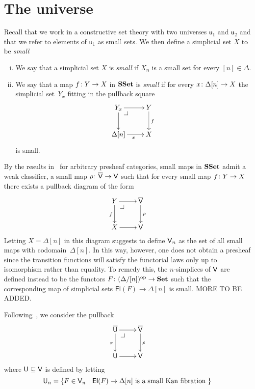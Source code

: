 \documentclass[reqno,10pt,a4paper,oneside,draft]{amsart}
\begin{document}
\newpage

\section{The universe}

Recall that we work in a constructive set theory with two universes $\mathsf{u}_1$ and $\mathsf{u}_2$
and that we refer to elements of $\mathsf{u}_1$ as small sets. We then define a simplicial
set $X$ to be \emph{small}


\begin{definition} \hfill 
\label{thm:small}
\begin{enumerate}[(i)]
\item We say that a simplicial set $X$ is \emph{small}  if $X_n$ is a small set for every $[n] \in \Delta$. 
\item We say that a map $f \colon Y \to X$ in $\mathbf{SSet}$ is \emph{small} if for every $x \colon \Delta[n] 
\to X$ the simplicial set~$Y_x$ fitting in the pullback square
\[
\xymatrix{
Y_x \ar[r] \ar[d] \drpullback & Y \ar[d]^{f} \\
\Delta[n] \ar[r]_x & X }
\]
is small.
\end{enumerate}
\end{definition} 

By the results in~\cite{hofmann-streicher-universes} for arbitrary presheaf categories, small maps in
 $\mathbf{SSet}$ admit a weak classifier, \ie a small map $\rho \colon \overline{\mathsf{V}} \to \mathsf{V}$ such 
that for every small map $f \colon Y \to X$ there exists  a pullback diagram of the form
\[
\xymatrix{
Y \ar[r] \ar[d]_f \drpullback  & \VV \ar[d]^\rho \\
X \ar[r] & \V }
\]
Letting $X = \Delta[n]$ in this diagram suggests to define $\mathsf{V}_n$ as the set of all small maps with codomain~$\Delta[n]$. In this way, however, one does not obtain a presheaf since the transition functions
will satisfy the functorial laws only up to isomorphism rather than equality. To remedy this, the $n$-simplices of $\mathsf{V}$ are defined instead to be the functors $F \colon (\Delta/[n])^{\operatorname{op}} \to \mathbf{Set}$ such that 
the corresponding map of simplicial sets $ \mathsf{El}(F) \to \Delta[n]$ is small. MORE TO BE ADDED.

\medskip

Following~\cite{cisinski-univalence,voevodsky-simplicial-model}, we consider the pullback 
\[
\xymatrix{
\UU \ar[r] \ar[d]_\pi \drpullback  & \VV \ar[d]^\rho \\
\U \ar[r] & \V }
\]
where $\mathsf{U} \subseteq \mathsf{V}$ is defined by letting 
\[
\mathsf{U}_n = \{ F \in \mathsf{V}_n \ | \ \mathsf{El}(F) \to \Delta[n] \text{ is a small Kan fibration } \}
\]
\end{document}
